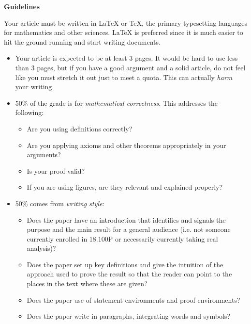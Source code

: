 \documentclass{article}
\begin{document}
    \par\hfill\par
    \textbf{\Large{Guidelines}}
    \par\hfill\par
    Your article must be written in \LaTeX{} or \TeX, the primary typesetting
    languages for mathematics and other sciences. \LaTeX{} is preferred since it
    is much easier to hit the ground running and start writing documents.
    \begin{itemize}
        \item
            Your article is expected to be at least 3 pages.
            It would be hard to use less than 3 pages, but if you have
            a good argument and a solid article, do not feel like you
            must stretch it out just to meet a quota. This can actually
            \textit{harm} your writing.
        \item
            50\% of the grade is for \textit{mathematical correctness}.
            This addresses the following:
            \begin{itemize}
                \item
                    Are you using definitions correctly?
                \item
                    Are you applying axioms and other theorems
                    appropriately in your arguments?
                \item
                    Is your proof valid?
                \item
                    If you are using figures, are they relevant and explained
                    properly?
            \end{itemize}
        \item
            50\% comes from \textit{writing style}:
            \begin{itemize}
                \item
                     Does the paper have an introduction that identifies
                     and signals the purpose and the main result for a
                     general audience (i.e. not someone currently enrolled
                     in 18.100P or necessarily currently taking real analysis)?
                \item
                    Does the paper set up key definitions and give the
                    intuition of the approach used to prove the result
                    so that the reader can point to the places in the
                    text where these are given?
                \item
                    Does the paper use of statement environments
                    and proof environments?
                \item
                    Does the paper write in paragraphs,
                    integrating words and symbols?
            \end{itemize}
    \end{itemize}
\end{document}
